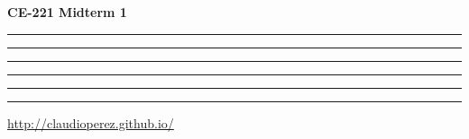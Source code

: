 \documentclass[9pt,landscape]{article}
\begin{document}
\raggedright
\footnotesize
\begin{multicols}{3}


\setlength{\premulticols}{1pt}
\setlength{\postmulticols}{1pt}
\setlength{\multicolsep}{1pt}
\setlength{\columnsep}{2pt}

\begin{center}
     \Large{\textbf{CE-221 Midterm 1}} \\
\end{center}

\vspace{2mm}


\hrule


\vspace{1.5mm}

\hrule
\vspace{1.5mm}

\vspace{1.5mm}

\hrule
\vspace{1.5mm}

\vspace{1.5mm}

\hrule
\vspace{1.5mm}

\vspace{1.5mm}

\hrule


\rule{0.3\linewidth}{0.25pt}
\scriptsize


\href{http://claudioperez.github.io/}{http://claudioperez.github.io/}


\end{multicols}
\end{document}
